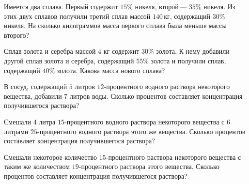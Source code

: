 \begin{class}[number=7]
\begin{listofex}
		\item Имеется два сплава. Первый содержит \(15\%\) никеля, второй --- \(35\%\) никеля. Из этих двух сплавов получили третий сплав массой \(140\) кг, содержащий \(30\%\) никеля. На сколько килограммов масса первого сплава была меньше массы второго?
		\item Сплав золота и серебра массой \(4\) кг содержит \(30\%\) золота. К нему добавили другой сплав золота и серебра, содержащий \(55\%\) золота и получили сплав, содержащий \(40\%\) золота. Какова масса нового сплава?
		\item В сосуд, содержащий \(5\) литров \(12\)-процентного водного раствора некоторого вещества, добавили \(7\) литров воды. Сколько процентов составляет концентрация получившегося раствора?
		\item Смешали \(4\) литра \(15\)-процентного водного раствора некоторого вещества с \(6\) литрами \(25\)-процентного водного раствора этого же вещества. Сколько процентов составляет концентрация получившегося раствора?
		\item Смешали некоторое количество \(15\)-процентного раствора некоторого вещества с таким же количеством \(19\)-процентного раствора этого вещества. Сколько процентов составляет концентрация получившегося раствора?
		
	\end{listofex}
\end{class}

